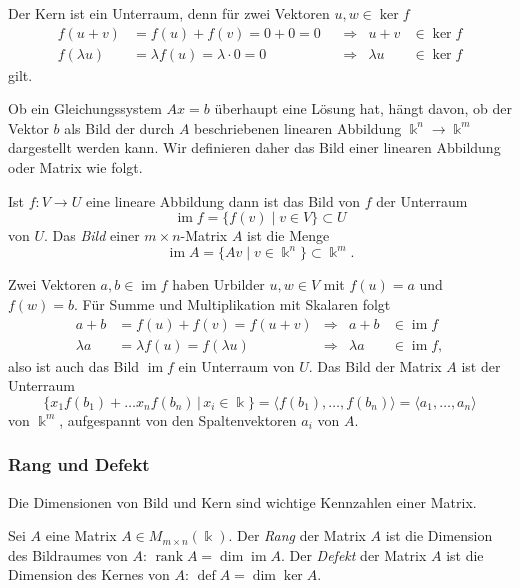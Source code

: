 Der Kern ist ein Unterraum, denn für zwei Vektoren $u,w\in \ker f$
\[
\begin{aligned}
f(u+v)&=f(u) + f(v) = 0+0 = 0 &&\Rightarrow& u+v&\in\ker f\\
f(\lambda u)&=\lambda f(u) = \lambda\cdot 0=0&&\Rightarrow& \lambda u&\in\ker f
\end{aligned}
\]
gilt.

Ob ein Gleichungssystem $Ax=b$ überhaupt eine Lösung hat, hängt davon,
ob der Vektor $b$ als Bild der durch $A$ beschriebenen linearen Abbildung
$\Bbbk^n \to \Bbbk^m$ dargestellt werden kann.
Wir definieren daher das Bild einer linearen Abbildung oder Matrix
wie folgt.

\begin{definition}
Ist $f\colon V\to U$ eine lineare Abbildung dann ist das Bild von $f$
der Unterraum
\[
\operatorname{im}f = \{ f(v)\;|\;v\in V\} \subset U
\]
von $U$.
Das {\em Bild} einer $m\times n$-Matrix $A$ ist die Menge
\[
\operatorname{im}A = \{ Av \;|\; v\in\Bbbk^n\} \subset \Bbbk^m.
\]
\end{definition}
%

Zwei Vektoren $a,b\in\operatorname{im} f$ haben Urbilder $u,w\in V$ mit
$f(u)=a$ und $f(w)=b$.
Für Summe und Multiplikation mit Skalaren folgt
\[
\begin{aligned}
a+b       &= f(u)+f(v)=f(u+v)           & \Rightarrow &       a+b &\in\operatorname{im}f\\
\lambda a &=\lambda f(u) = f(\lambda u) & \Rightarrow & \lambda a &\in\operatorname{im}f,
\end{aligned}
\]
also ist auch das Bild $\operatorname{im}f$ ein Unterraum von $U$.
Das Bild der Matrix $A$ ist der Unterraum
\[
\{ x_1f(b_1) + \dots x_n f(b_n) \,|\, x_i\in\Bbbk\}
=
\langle f(b_1),\dots,f(b_n)\rangle
=
\langle a_1,\dots,a_n\rangle
\]
von $\Bbbk^m$, aufgespannt von den Spaltenvektoren $a_i$ von $A$.

\subsubsection{Rang und Defekt}
Die Dimensionen von Bild und Kern sind wichtige Kennzahlen einer Matrix.
\begin{definition}
Sei $A$ eine Matrix $A\in M_{m\times n}(\Bbbk)$.
Der {\em Rang} der Matrix $A$ ist die Dimension des Bildraumes von $A$:
$\operatorname{rank}A=\dim\operatorname{im} A$.
%
%
Der {\em Defekt} der Matrix $A$ ist die Dimension des Kernes von $A$:
$\operatorname{def}A=\dim\ker A$.
%
\end{definition}

